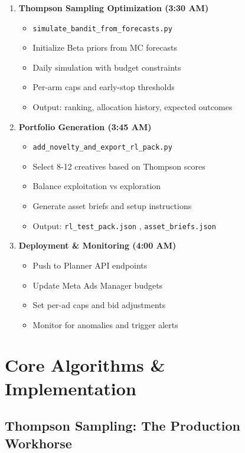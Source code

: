 \documentclass[11pt,a4paper]{report}
\newcommand{\codeinline}[1]{%
    \colorbox{aelpgray!10}{\texttt{#1}}%
}
\begin{document}
\begin{enumerate}[leftmargin=*]
    \item \textbf{Thompson Sampling Optimization (3:30 AM)}
    \begin{itemize}
        \item \codeinline{simulate\_bandit\_from\_forecasts.py}
        \item Initialize Beta priors from MC forecasts
        \item Daily simulation with budget constraints
        \item Per-arm caps and early-stop thresholds
        \item Output: ranking, allocation history, expected outcomes
    \end{itemize}

    \item \textbf{Portfolio Generation (3:45 AM)}
    \begin{itemize}
        \item \codeinline{add\_novelty\_and\_export\_rl\_pack.py}
        \item Select 8-12 creatives based on Thompson scores
        \item Balance exploitation vs exploration
        \item Generate asset briefs and setup instructions
        \item Output: \codeinline{rl\_test\_pack.json}, \codeinline{asset\_briefs.json}
    \end{itemize}

    \item \textbf{Deployment \& Monitoring (4:00 AM)}
    \begin{itemize}
        \item Push to Planner API endpoints
        \item Update Meta Ads Manager budgets
        \item Set per-ad caps and bid adjustments
        \item Monitor for anomalies and trigger alerts
    \end{itemize}
\end{enumerate}

\chapter{Core Algorithms \& Implementation}

\section{Thompson Sampling: The Production Workhorse}
\end{document}
